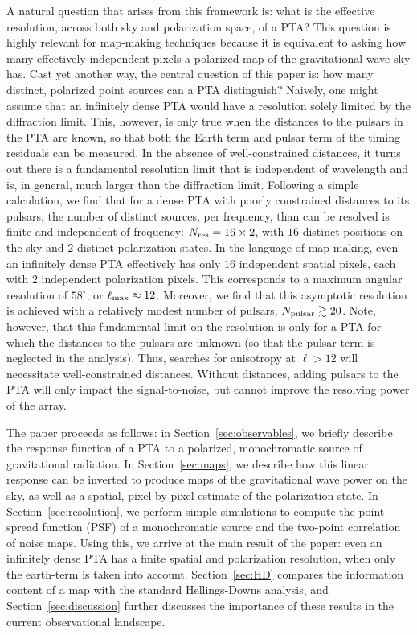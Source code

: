 \documentclass[%
 reprint,
nofootinbib,
 amsmath,amssymb,
 aps,
]{revtex4-2}
\begin{document}
A natural question that arises from this framework is: what is the effective resolution, across both sky and polarization space, of a PTA? This question is highly relevant for map-making techniques because it is equivalent to asking how many effectively independent pixels a polarized map of the gravitational wave sky has. Cast yet another way, the central question of this paper is: how many distinct, polarized point sources can a PTA distinguish? Naively, one might assume that an infinitely dense PTA would have a resolution solely limited by the diffraction limit. This, however, is only true when the distances to the pulsars in the PTA are known, so that both the Earth term and pulsar term of the timing residuals can be measured. In the absence of well-constrained distances, it turns out there is a fundamental resolution limit that is independent of wavelength and is, in general, much larger than the diffraction limit\citep{BoylePen2012,2017ApJ...835...21R}.  Following a simple calculation, we find that for a dense PTA with poorly constrained distances to its pulsars, the number of distinct sources, per frequency, than can be resolved is finite and independent of frequency: $N_{\rm res} = 16 \times 2$, with $16$ distinct positions on the sky and $2$ distinct polarization states. In the language of map making, even an infinitely dense PTA effectively has only $16$ independent spatial pixels, each with $2$ independent polarization pixels. This corresponds to a maximum angular resolution of $58^\circ$, or $\ell_{\rm max} \approx 12$. Moreover, we find that this asymptotic resolution is achieved with a relatively modest number of pulsars, $N_{\rm pulsar} \gtrsim 20$. Note, however, that this fundamental limit on the resolution is only for a PTA for which the distances to the pulsars are unknown (so that the pulsar term is neglected in the analysis). Thus, searches for anisotropy at $\ell > 12$ will necessitate well-constrained distances. Without distances, adding pulsars to the PTA will only impact the signal-to-noise, but cannot improve the resolving power of the array.

The paper proceeds as follows: in Section~\ref{sec:observables}, we briefly describe the response function of a PTA to a polarized, monochromatic source of gravitational radiation. In Section~\ref{sec:maps}, we describe how this linear response can be inverted to produce maps of the gravitational wave power on the sky, as well as a spatial, pixel-by-pixel estimate of the polarization state. In Section~\ref{sec:resolution}, we perform simple simulations to compute the point-spread function (PSF) of a monochromatic source and the two-point correlation of noise maps. Using this, we arrive at the main result of the paper: even an infinitely dense PTA has a finite spatial and polarization resolution, when only the earth-term is taken into account. Section~\ref{sec:HD} compares the information content of a map with the standard Hellings-Downs analysis, and Section~\ref{sec:discussion} further discusses the importance of these results in the current observational landscape. 
\end{document}
